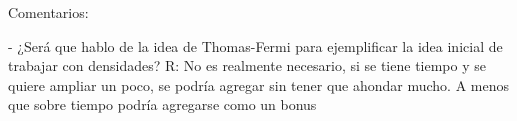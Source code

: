 \documentclass [11pt]{article}
\begin{document}
\vspace{20 cm}

Comentarios:

- ¿Será que hablo de la idea de Thomas-Fermi para ejemplificar la idea inicial de trabajar con densidades? R: No es realmente necesario, si se tiene tiempo y se quiere ampliar un poco, se podría agregar sin tener que ahondar mucho. A menos que sobre tiempo podría agregarse como un bonus





















 

























\vspace{20 cm}
\nocite{*}


\end{document}
